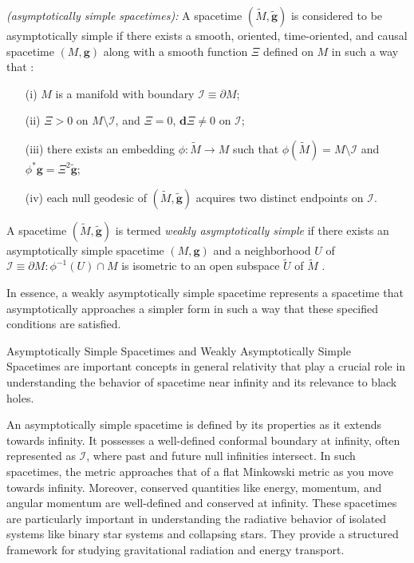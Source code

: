 \begin{mydefinition}\label{def:asymptoticallysimple}
  \textit{(asymptotically simple spacetimes):} A spacetime $(\tilde{{M}}, \boldsymbol{\tilde{g}})$ is considered to be asymptotically simple if there exists a smooth, oriented, time-oriented, and causal spacetime  $({{M}},\boldsymbol{g})$ along with a smooth function $\Xi$ defined on ${M}$ in such a way that \cite{Ste91}:
  \begin{enumerate}
    \item[(i)] ${M}$ is a manifold with boundary $\mathcal{I} \equiv \partial {M}$;
    \item[(ii)] $\Xi > 0$ on ${M} \setminus \mathcal{I}$, and $\Xi = 0$, $\boldsymbol{d}\Xi \neq 0$ on $\mathcal{I}$;
    \item[(iii)] there exists an embedding $\phi: {\tilde{M}} \rightarrow {M}$ such that $\phi(\tilde{{M}}) = {M}\setminus \mathcal{I}$ and $\phi^{*}\boldsymbol{g} = \Xi^{2}\boldsymbol{\tilde{g}}$;
    \item[(iv)] each null geodesic of $({\tilde{M}}, \boldsymbol{\tilde{g}})$ acquires two distinct endpoints on $\mathcal{I}$.
  \end{enumerate}
\end{mydefinition}

\begin{mydefinition}\label{def:weaklyasymptoticallysimple}
  A spacetime $(\tilde{{M}}, \boldsymbol{\tilde{g}})$ is termed \textit{weakly asymptotically simple} if there exists an asymptotically simple spacetime $({M}, \boldsymbol{g})$ and a neighborhood $U$ of $\mathcal{I} \equiv \partial {M}: \phi^{-1}(U) \cap {M}$ is isometric to an open subspace $\tilde{U}$ of $\tilde{{M}}$ \cite{Val16}. 
\end{mydefinition}

In essence, a weakly asymptotically simple spacetime represents a spacetime that asymptotically approaches a simpler form in such a way that these specified conditions are satisfied.

Asymptotically Simple Spacetimes and Weakly Asymptotically Simple Spacetimes are important concepts in general relativity that play a crucial role in understanding the behavior of spacetime near infinity and its relevance to black holes.

An asymptotically simple spacetime is defined by its properties as it extends towards infinity. It possesses a well-defined conformal boundary at infinity, often represented as $\mathcal{I}$, where past and future null infinities intersect. In such spacetimes, the metric approaches that of a flat Minkowski metric as you move towards infinity. Moreover, conserved quantities like energy, momentum, and angular momentum are well-defined and conserved at infinity. These spacetimes are particularly important in understanding the radiative behavior of isolated systems like binary star systems and collapsing stars. They provide a structured framework for studying gravitational radiation and energy transport.


